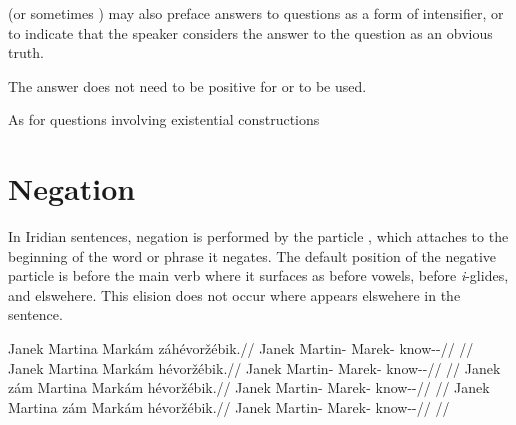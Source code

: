 \ex
{}\xe

\ex{}
\xe

 (or sometimes ) may also preface answers to questions as a
form of intensifier, or to indicate that the speaker considers the answer to the
question as an obvious truth.

\ex
{}\xe

The answer does not need to be positive for  or  to be used.

\ex{}
\xe


As for questions involving existential constructions


\section{Negation}\label{sec:negation}

In Iridian sentences, negation is performed by the particle , which
attaches to the beginning of the word or phrase  it negates. The default
position of the negative particle is before the main verb where it surfaces as
 before vowels,  before \emph{i}-glides, and 
elswehere. This elision does not occur where  appears elswehere in
the sentence.

\pex
\a
\begingl
    \gla Janek Martina Markám {zá}hévoržébik.//
    \glb Janek Martin-\Acc{} Marek-\Agt{} \Neg{}know-\Ben{}-\Pf{}//
    \glft {}//
\endgl
\a
\begingl
     Janek Martina Markám hévoržébik.//
    \glb \Neg{} Janek Martin-\Acc{} Marek-\Agt{} know-\Ben{}-\Pf{}//
    \glft {}//
\endgl
\a
\begingl
    \gla Janek {zám} Martina Markám hévoržébik.//
    \glb Janek \Neg{} Martin-\Acc{} Marek-\Agt{} know-\Ben{}-\Pf{}//
    \glft {}//
\endgl
\a
\begingl
    \gla Janek Martina {zám} Markám hévoržébik.//
    \glb Janek Martin-\Acc{} \Neg{} Marek-\Agt{} know-\Ben{}-\Pf{}//
    \glft {}//
\endgl
\xe

